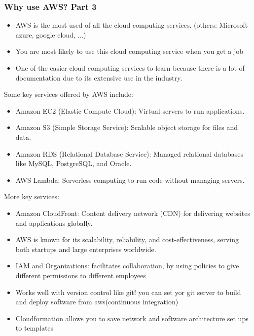 \documentclass{beamer}
\begin{document}
\begin{frame}\frametitle{Why use AWS? Part 3}
\begin{itemize}
\item AWS is the most used of all the cloud computing services. (others: Microsoft azure, google cloud, ...)
\item You are most likely to use this cloud computing service when you get a job
\item One of the easier cloud computing services to learn because there is a lot of documentation due to its extensive use in the industry.    
\end{itemize}
\end{frame}

\begin{frame}{Some key services offered by AWS include:}
\begin{itemize}
\item Amazon EC2 (Elastic Compute Cloud): Virtual servers to run applications.
\item Amazon S3 (Simple Storage Service): Scalable object storage for files and data.
\item Amazon RDS (Relational Database Service): Managed relational databases like MySQL, PostgreSQL, and Oracle.
\item AWS Lambda: Serverless computing to run code without managing servers.
\end{itemize}
\end{frame}


\begin{frame}{More key services:}
\begin{itemize}
\item Amazon CloudFront: Content delivery network (CDN) for delivering websites and applications globally.
\item AWS is known for its scalability, reliability, and cost-effectiveness, serving both startups and large enterprises worldwide.
\item IAM and Organizations: facilitates collaboration, by using policies to give different permissions to different employees
\item Works well with version control like git! you can set yor git server to build and deploy software from aws(continuous integration)
\item Cloudformation allows you to save network and software architecture set ups to templates
\end{itemize} 
\end{frame}
\end{document}
